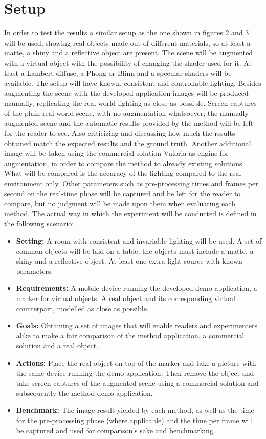 \section{Setup}
In order to test the results a similar setup as the one shown in figures 2 and 3 will be used, showing real objects made out of different materials, so at least a matte, a shiny and a reflective object are present. The scene will be augmented with a virtual object with the possibility of changing the shader used for it. At least a Lambert diffuse, a Phong or Blinn and a specular shaders will be available. The setup will have known,  consistent and controllable lighting.\newline
Besides augmenting the scene with the developed application images will be produced manually, replicating the real world lighting as close as possible. Screen captures of the plain real world scene, with no augmentation whatsoever; the manually augmented scene and the automatic results provided by the method will be left for the reader to see. Also criticizing and discussing how much the results obtained match the expected results and the ground truth. Another additional image will be taken using the commercial solution Vuforia as engine for augmentation, in order to compare the method to already existing solutions. What will be compared is the accuracy of the lighting compared to the real environment only. Other parameters such as pre-processing times and frames per second on the real-time phase will be captured and be left for the reader to compare, but no judgment will be made upon them when evaluating each method.\newline
The actual way in which the experiment will be conducted is defined in the following scenario:
\begin{itemize}
    \item \textbf{Setting:} A room with consistent and invariable lighting will be used. A set of common objects will be laid on a table, the objects must include a matte, a shiny and a reflective object. At least one extra light source with known parameters.
    \item \textbf{Requirements:} A mobile device running the developed demo application, a marker for virtual objects. A real object and its corresponding virtual counterpart, modelled as close as possible. 
    \item \textbf{Goals:} Obtaining a set of images that will enable readers and experimenters alike to make a fair comparison of the method application, a commercial solution and a real object.
    \item \textbf{Actions:} Place the real object on top of the marker and take a picture with the same device running the demo application. Then remove the object and take screen captures of the augmented scene using a commercial solution and subsequently the method demo application.
     \item \textbf{Benchmark:} The image result yielded by each method, as well as the time for the pre-processing phase (where applicable) and the time per frame will be captured and used for comparison's sake and benchmarking.
\end{itemize}

